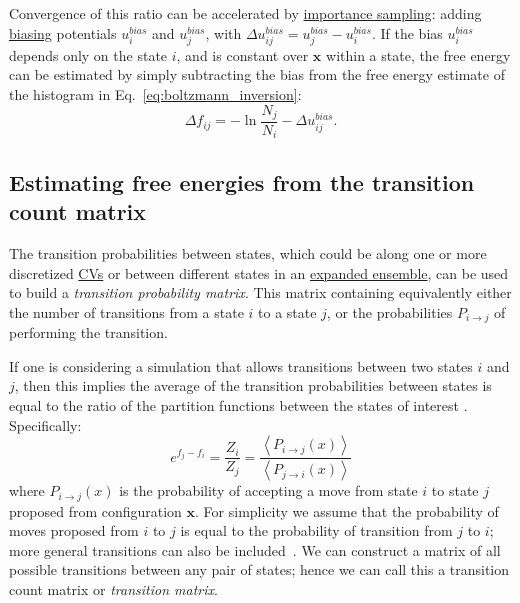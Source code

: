 \documentclass[9pt,review]{livecoms}
\newcommand{\vx}{\mathbf{x}}
\begin{document}
Convergence of this ratio can be accelerated by \hyperlink{ref:IS} {importance sampling}: adding \hyperlink{ref:biasingE} {biasing} potentials $u^{bias}_i$ and $u^{bias}_j$, with $\Delta u^{bias}_{ij}=u^{bias}_j - u^{bias}_i$.
If the bias $u^{bias}_i$ depends only on the state $i$, and is constant over $\vx$ within a state, the free energy can be estimated by simply subtracting the bias from the free energy estimate of the histogram in Eq.~\ref{eq:boltzmann_inversion}: \begin{equation}
\Delta f_{ij} = -\ln \frac{N_j}{N_i} - \Delta u^{bias}_{ij}.
\label{eq:boltzmann_inversion_biased}
\end{equation}

\subsection{Estimating free energies from the transition count matrix\label{sec:transition_matrix}}

The transition probabilities between states, which could be along one or more discretized \hyperlink{ref:CV} {CVs} or between different states in an \hyperlink{ref:ExpEns}{expanded ensemble}, can be used to build a \textit{transition probability matrix}. This matrix containing equivalently either the number of transitions from a state $i$ to a state $j$, or the probabilities $P_{i\rightarrow j}$ of performing the transition.

If one is considering a simulation that allows transitions between two states $i$ and $j$, then this implies the average of the transition probabilities between states is equal to the ratio of the partition functions between the states of interest \cite{deOliveira:EPJB:1998,Wang:JoSP:2002,escobedo_transition_2006}. Specifically:
\begin{equation}
e^{f_j-f_i} = \frac{Z_i}{Z_j} = \frac{\left \langle  P_{i\rightarrow j}(x)\right\rangle}{\left \langle P_{j\rightarrow i}(x) \right \rangle}
\end{equation}
where $P_{i\rightarrow j}(x)$ is the probability of accepting a move from state $i$ to state $j$ proposed from configuration $\vx$. For simplicity we assume that the probability of moves proposed from $i$ to $j$ is equal to the probability of transition from $j$ to $i$; more general transitions can also be included~\cite{escobedo_transition_2006}. We can construct a matrix of all possible transitions between any pair of states; hence we can call this a transition count matrix or \textit{transition matrix}.
\end{document}
